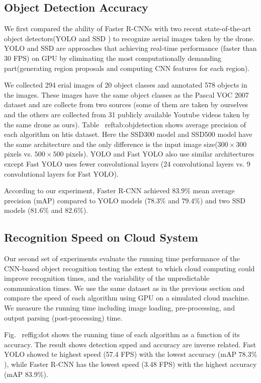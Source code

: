 \subsection{Object Detection Accuracy}
We first compared the ability of Faster R-CNNs with two recent state-of-the-art object detectors(YOLO
 and SSD
) to recognize aerial images taken by the drone.
YOLO and SSD are approaches that achieving real-time performance (faster than 30 FPS) on GPU by eliminating the most computationally demanding part(generating region proposals and computing CNN features for each region). 

We collected 294 erial images of 20 object classes and annotated 578 objects in the images. These images have the same object classes as the Pascal VOC 2007 dataset and are collecte from two sources (some of them are taken by ourselves and the others are collected from 31 publicly available Youtube videos taken by the same drone as ours).
Table ~ref{tab:objdetection} shows average precision of each algorithm on htis dataset. Here the SSD300 model and SSD500 model have the same architecture and the only difference is the input image size($300 \times 300$ pixels vs. $500 \times 500$ pixels). YOLO and Fast YOLO also use similar architectures except Fast YOLO uses fewer convolutional layers (24 convolutional layers vs. 9 convolutional layers for Fast YOLO).

According to our experiment, Faster R-CNN achieved $83.9\%$ mean average precision (mAP) compared to YOLO models ($78.3\%$ and $79.4\%$) and two SSD models ($81.6\%$ and $82.6\%$).

\subsection{Recognition Speed on Cloud System}
Our second set of experiments evaluate the running time performance of the CNN-based object recognition testing the extent to which cloud computing could improve recognition times, and the variability of the unpredictable communication times. We use the same dataset as in the previous section and compare the speed of each algorithm using GPU on a simulated cloud machine.
We measure the running time including image loading, pre-processing, and output parsing (post-processing) time.

Fig. ~ref{fig:dot} shows the running time of each algorithm as a function of its accuracy. The result shows detection spped and accuracy are inverse related. Fast YOLO showed te highest speed (57.4 FPS) with the lowest accuracy (mAP $78.3\%$), while Faster R-CNN has the lowest speed (3.48 FPS) with the highest accuracy (mAP $83.9\%$).

